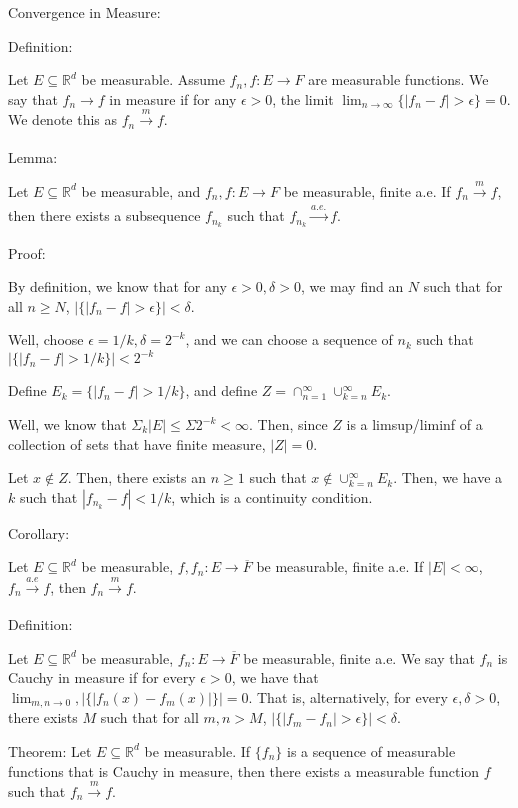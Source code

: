 \documentclass[10pt]{article}
\begin{document}
Convergence in Measure:

Definition:

Let $E \subseteq \mathbb{R}^d$ be measurable. Assume $f_n, f: E \to F$ are measurable functions. We say that $f_n \to f$ in measure if for any $\epsilon > 0$, the limit $\lim_{n \to \infty} \{ | f_n - f | > \epsilon \} = 0$. We denote this as $f_n \xrightarrow[]{m} f$.

Lemma:

Let $E \subseteq \mathbb{R}^d$ be measurable, and $f_n,f: E \to F$ be measurable, finite a.e. If $f_n \xrightarrow[]{m} f$, then there exists a subsequence $f_{n_k}$ such that $f_{n_k} \xrightarrow[]{a.e.} f$.

Proof:

By definition, we know that for any $\epsilon > 0, \delta > 0$, we may find an $N$ such that for all $n \geq N$, $| \{ | f_n - f| > \epsilon \} | < \delta$.

Well, choose $\epsilon = 1/k, \delta = 2^{-k}$, and we can choose a sequence of $n_k$ such that $|\{ | f_n - f| > 1/k \}| < 2^{-k}$

Define $E_k = \{ | f_n - f| > 1/k \}$, and define $Z = \cap_{n=1}^\infty \cup_{k=n}^\infty E_k$.

Well, we know that $\Sigma_{k} |E| \leq \Sigma 2^{-k} < \infty$. Then, since $Z$ is a limsup/liminf of a collection of sets that have finite measure, $|Z| = 0$.

Let $x \not \in Z$. Then, there exists an $n \geq 1$ such that $x \not \in \cup_{k=n}^\infty E_k$. Then, we have a $k$ such that $|f_{n_k} - f| < 1/k$, which is a continuity condition.

Corollary:

Let $E \subseteq \mathbb{R}^d$ be measurable, $f,f_n: E \to \overline{F}$ be measurable, finite a.e. If $|E| < \infty$, $f_n \xrightarrow[]{a.e} f$, then $f_n \xrightarrow[]{m} f$.

Definition:

Let $E \subseteq \mathbb{R}^d$ be measurable, $f_n: E \to \overline{F}$ be measurable, finite a.e. We say that $f_n$ is Cauchy in measure if for every $\epsilon > 0$, we have that $\lim_{m,n \to 0}, | \{ | f_n(x)  - f_m(x) | \} | = 0$. That is, alternatively, for every $\epsilon,\delta > 0$, there exists $M$ such that for all $m,n > M$, $| \{| f_m - f_n | > \epsilon \} | < \delta$.

Theorem: Let $E \subseteq \mathbb{R}^d$ be measurable. If $\{ f_n \}$ is a sequence of measurable functions that is Cauchy in measure, then there exists a measurable function $f$ such that $f_n \xrightarrow[]{m} f$.
\end{document}
